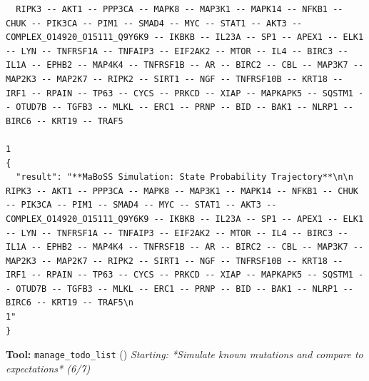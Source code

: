 \documentclass[11pt,a4paper]{article}
\begin{document}
\begin{toolokbox}
\begin{lstlisting}
  RIPK3 -- AKT1 -- PPP3CA -- MAPK8 -- MAP3K1 -- MAPK14 -- NFKB1 -- CHUK -- PIK3CA -- PIM1 -- SMAD4 -- MYC -- STAT1 -- AKT3 -- COMPLEX_O14920_O15111_Q9Y6K9 -- IKBKB -- IL23A -- SP1 -- APEX1 -- ELK1 -- LYN -- TNFRSF1A -- TNFAIP3 -- EIF2AK2 -- MTOR -- IL4 -- BIRC3 -- IL1A -- EPHB2 -- MAP4K4 -- TNFRSF1B -- AR -- BIRC2 -- CBL -- MAP3K7 -- MAP2K3 -- MAP2K7 -- RIPK2 -- SIRT1 -- NGF -- TNFRSF10B -- KRT18 -- IRF1 -- RPAIN -- TP63 -- CYCS -- PRKCD -- XIAP -- MAPKAPK5 -- SQSTM1 -- OTUD7B -- TGFB3 -- MLKL -- ERC1 -- PRNP -- BID -- BAK1 -- NLRP1 -- BIRC6 -- KRT19 -- TRAF5
                                                                                                                                                                                                                                                                                                                                                                                                                                                                                                                                                                                    1
{
  "result": "**MaBoSS Simulation: State Probability Trajectory**\n\n  RIPK3 -- AKT1 -- PPP3CA -- MAPK8 -- MAP3K1 -- MAPK14 -- NFKB1 -- CHUK -- PIK3CA -- PIM1 -- SMAD4 -- MYC -- STAT1 -- AKT3 -- COMPLEX_O14920_O15111_Q9Y6K9 -- IKBKB -- IL23A -- SP1 -- APEX1 -- ELK1 -- LYN -- TNFRSF1A -- TNFAIP3 -- EIF2AK2 -- MTOR -- IL4 -- BIRC3 -- IL1A -- EPHB2 -- MAP4K4 -- TNFRSF1B -- AR -- BIRC2 -- CBL -- MAP3K7 -- MAP2K3 -- MAP2K7 -- RIPK2 -- SIRT1 -- NGF -- TNFRSF10B -- KRT18 -- IRF1 -- RPAIN -- TP63 -- CYCS -- PRKCD -- XIAP -- MAPKAPK5 -- SQSTM1 -- OTUD7B -- TGFB3 -- MLKL -- ERC1 -- PRNP -- BID -- BAK1 -- NLRP1 -- BIRC6 -- KRT19 -- TRAF5\n                                                                                                                                                                                                                                                                                                                                                                                                                                                                                                                                                                                    1"
}
\end{lstlisting}
\end{toolokbox}
\begin{toolokbox}
\textbf{Tool:} \texttt{manage\_todo\_list} (\checkmark)
\textit{Starting: *Simulate known mutations and compare to expectations* (6/7)}
\end{toolokbox}
\end{document}
